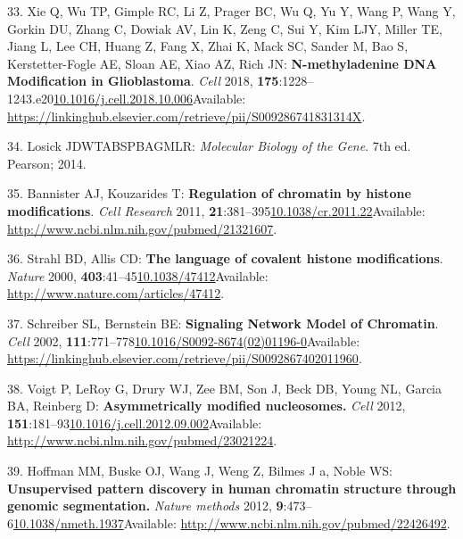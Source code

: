 \documentclass[
]{book}
\begin{document}
\leavevmode\hypertarget{ref-Xie2018}{}%
33. Xie Q, Wu TP, Gimple RC, Li Z, Prager BC, Wu Q, Yu Y, Wang P, Wang Y, Gorkin DU, Zhang C, Dowiak AV, Lin K, Zeng C, Sui Y, Kim LJY, Miller TE, Jiang L, Lee CH, Huang Z, Fang X, Zhai K, Mack SC, Sander M, Bao S, Kerstetter-Fogle AE, Sloan AE, Xiao AZ, Rich JN: \textbf{N-methyladenine DNA Modification in Glioblastoma}. \emph{Cell} 2018, \textbf{175}:1228--1243.e20\href{https://doi.org/10.1016/j.cell.2018.10.006}{10.1016/j.cell.2018.10.006}Available: \url{https://linkinghub.elsevier.com/retrieve/pii/S009286741831314X}.

\leavevmode\hypertarget{ref-Losick2014}{}%
34. Losick JDWTABSPBAGMLR: \emph{Molecular Biology of the Gene}. 7th ed. Pearson; 2014.

\leavevmode\hypertarget{ref-Bannister2011}{}%
35. Bannister AJ, Kouzarides T: \textbf{Regulation of chromatin by histone modifications}. \emph{Cell Research} 2011, \textbf{21}:381--395\href{https://doi.org/10.1038/cr.2011.22}{10.1038/cr.2011.22}Available: \url{http://www.ncbi.nlm.nih.gov/pubmed/21321607}.

\leavevmode\hypertarget{ref-Strahl2000}{}%
36. Strahl BD, Allis CD: \textbf{The language of covalent histone modifications}. \emph{Nature} 2000, \textbf{403}:41--45\href{https://doi.org/10.1038/47412}{10.1038/47412}Available: \url{http://www.nature.com/articles/47412}.

\leavevmode\hypertarget{ref-Schreiber2002}{}%
37. Schreiber SL, Bernstein BE: \textbf{Signaling Network Model of Chromatin}. \emph{Cell} 2002, \textbf{111}:771--778\href{https://doi.org/10.1016/S0092-8674(02)01196-0}{10.1016/S0092-8674(02)01196-0}Available: \url{https://linkinghub.elsevier.com/retrieve/pii/S0092867402011960}.

\leavevmode\hypertarget{ref-Voigt2012}{}%
38. Voigt P, LeRoy G, Drury WJ, Zee BM, Son J, Beck DB, Young NL, Garcia BA, Reinberg D: \textbf{Asymmetrically modified nucleosomes.} \emph{Cell} 2012, \textbf{151}:181--93\href{https://doi.org/10.1016/j.cell.2012.09.002}{10.1016/j.cell.2012.09.002}Available: \url{http://www.ncbi.nlm.nih.gov/pubmed/23021224}.

\leavevmode\hypertarget{ref-Hoffman2012}{}%
39. Hoffman MM, Buske OJ, Wang J, Weng Z, Bilmes J a, Noble WS: \textbf{Unsupervised pattern discovery in human chromatin structure through genomic segmentation.} \emph{Nature methods} 2012, \textbf{9}:473--6\href{https://doi.org/10.1038/nmeth.1937}{10.1038/nmeth.1937}Available: \url{http://www.ncbi.nlm.nih.gov/pubmed/22426492}.
\end{document}
